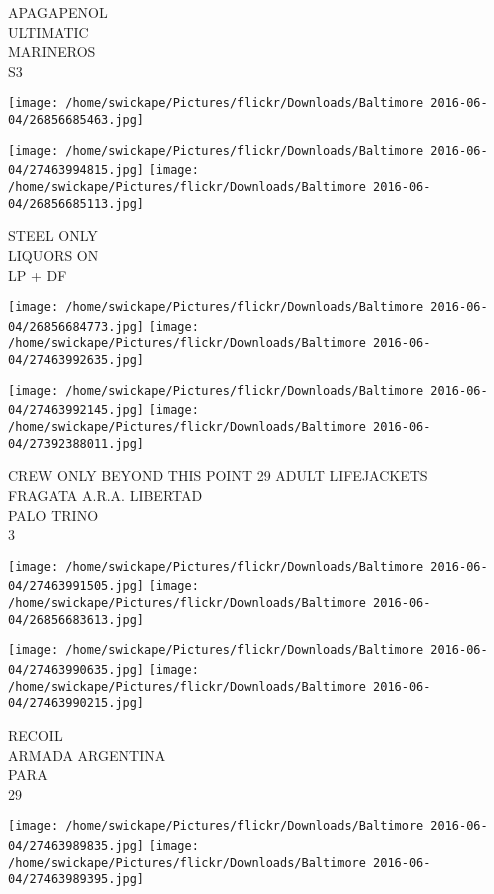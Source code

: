 \documentclass[10pt,letterpaper]{article}
\begin{document}
APAGAPENOL\\
ULTIMATIC\\
MARINEROS\\
S3
\pagebreak

\texttt{[image: /home/swickape/Pictures/flickr/Downloads/Baltimore 2016-06-04/26856685463.jpg]}

\vspace{0.25in}
\texttt{[image: /home/swickape/Pictures/flickr/Downloads/Baltimore 2016-06-04/27463994815.jpg]}
\texttt{[image: /home/swickape/Pictures/flickr/Downloads/Baltimore 2016-06-04/26856685113.jpg]}

STEEL ONLY\\
LIQUORS ON\\
LP + DF
\pagebreak

\texttt{[image: /home/swickape/Pictures/flickr/Downloads/Baltimore 2016-06-04/26856684773.jpg]}
\texttt{[image: /home/swickape/Pictures/flickr/Downloads/Baltimore 2016-06-04/27463992635.jpg]}

\texttt{[image: /home/swickape/Pictures/flickr/Downloads/Baltimore 2016-06-04/27463992145.jpg]}
\texttt{[image: /home/swickape/Pictures/flickr/Downloads/Baltimore 2016-06-04/27392388011.jpg]}

CREW ONLY BEYOND THIS POINT 29 ADULT LIFEJACKETS\\
FRAGATA A.R.A. LIBERTAD\\
PALO TRINO\\
3
\pagebreak

\texttt{[image: /home/swickape/Pictures/flickr/Downloads/Baltimore 2016-06-04/27463991505.jpg]}
\texttt{[image: /home/swickape/Pictures/flickr/Downloads/Baltimore 2016-06-04/26856683613.jpg]}

\texttt{[image: /home/swickape/Pictures/flickr/Downloads/Baltimore 2016-06-04/27463990635.jpg]}
\texttt{[image: /home/swickape/Pictures/flickr/Downloads/Baltimore 2016-06-04/27463990215.jpg]}

RECOIL\\
ARMADA ARGENTINA\\
PARA\\
29
\pagebreak

\texttt{[image: /home/swickape/Pictures/flickr/Downloads/Baltimore 2016-06-04/27463989835.jpg]}
\texttt{[image: /home/swickape/Pictures/flickr/Downloads/Baltimore 2016-06-04/27463989395.jpg]}
\end{document}
